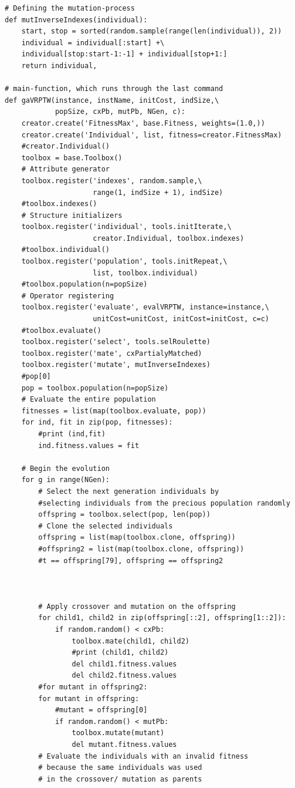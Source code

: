 \documentclass[a4paper,12pt,parskip,bibtotoc,liststotoc]{article}
\begin{document}
\begin{appendix}
\begin{lstlisting}
# Defining the mutation-process
def mutInverseIndexes(individual):
    start, stop = sorted(random.sample(range(len(individual)), 2))
    individual = individual[:start] +\
    individual[stop:start-1:-1] + individual[stop+1:]
    return individual,

# main-function, which runs through the last command
def gaVRPTW(instance, instName, initCost, indSize,\
            popSize, cxPb, mutPb, NGen, c):
    creator.create('FitnessMax', base.Fitness, weights=(1.0,))
    creator.create('Individual', list, fitness=creator.FitnessMax)
    #creator.Individual()
    toolbox = base.Toolbox()
    # Attribute generator
    toolbox.register('indexes', random.sample,\
                     range(1, indSize + 1), indSize)
    #toolbox.indexes()
    # Structure initializers
    toolbox.register('individual', tools.initIterate,\
                     creator.Individual, toolbox.indexes)
    #toolbox.individual()
    toolbox.register('population', tools.initRepeat,\
                     list, toolbox.individual)
    #toolbox.population(n=popSize)
    # Operator registering
    toolbox.register('evaluate', evalVRPTW, instance=instance,\
                     unitCost=unitCost, initCost=initCost, c=c)
    #toolbox.evaluate()
    toolbox.register('select', tools.selRoulette)
    toolbox.register('mate', cxPartialyMatched)
    toolbox.register('mutate', mutInverseIndexes)
    #pop[0]
    pop = toolbox.population(n=popSize)
    # Evaluate the entire population
    fitnesses = list(map(toolbox.evaluate, pop))
    for ind, fit in zip(pop, fitnesses):
        #print (ind,fit)
        ind.fitness.values = fit

    # Begin the evolution
    for g in range(NGen):
        # Select the next generation individuals by
        #selecting individuals from the precious population randomly
        offspring = toolbox.select(pop, len(pop))
        # Clone the selected individuals
        offspring = list(map(toolbox.clone, offspring))
        #offspring2 = list(map(toolbox.clone, offspring))
        #t == offspring[79], offspring == offspring2
        

        
        # Apply crossover and mutation on the offspring
        for child1, child2 in zip(offspring[::2], offspring[1::2]):
            if random.random() < cxPb:
                toolbox.mate(child1, child2)
                #print (child1, child2)
                del child1.fitness.values
                del child2.fitness.values
        #for mutant in offspring2:
        for mutant in offspring:
            #mutant = offspring[0]
            if random.random() < mutPb:
                toolbox.mutate(mutant)
                del mutant.fitness.values
        # Evaluate the individuals with an invalid fitness
        # because the same individuals was used
        # in the crossover/ mutation as parents
        

\end{lstlisting}
\end{appendix}
\end{document}
